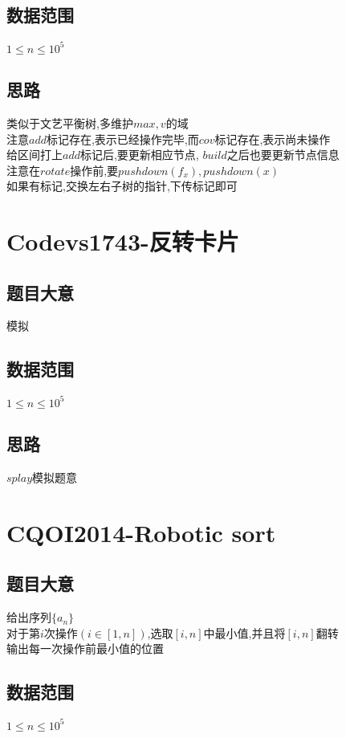 \documentclass{ctexart}
\numberwithin{equation}{section}
\begin{document}
\begin{flushleft}
  \subsection{数据范围}
  $1\le n\le 10^5$\\
  \subsection{思路}
  类似于文艺平衡树,多维护$max,v$的域\\
  注意$add$标记存在,表示已经操作完毕,而$cov$标记存在,表示尚未操作\\
  给区间打上$add$标记后,要更新相应节点, $build$之后也要更新节点信息\\
  注意在$rotate$操作前,要$pushdown(f_x),pushdown(x)$\\
  如果有标记,交换左右子树的指针,下传标记即可\\
  \newpage

  \section{Codevs1743-反转卡片}
  \subsection{题目大意}
  模拟
  \subsection{数据范围}
  $1\le n\le 10^5$\\
  \subsection{思路}
  $splay$模拟题意\\
  \newpage

  \section{CQOI2014-Robotic sort}
  \subsection{题目大意}
  给出序列$\{a_n\}$\\
  对于第$i$次操作$(i\in[1,n])$,选取$[i,n]$中最小值,并且将$[i,n]$翻转\\
  输出每一次操作前最小值的位置\\
  \subsection{数据范围}
  $1\le n\le 10^5$\\

\end{flushleft}
\end{document}
